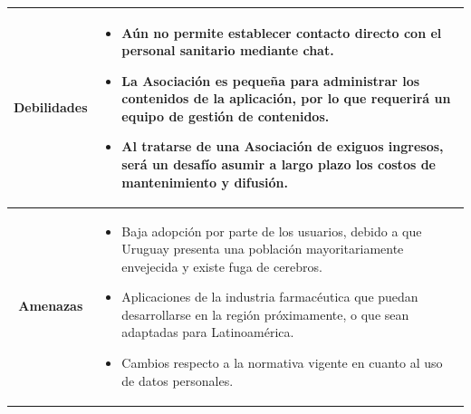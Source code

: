 \begin{tabular}{|c|l|}
\hline
\textbf{Debilidades} & \parbox{10cm}{
\begin{itemize}
    \item Aún no permite establecer contacto directo con el personal sanitario mediante chat.
    \item La Asociación es pequeña para administrar los contenidos de la aplicación, por lo que requerirá un equipo de gestión de contenidos.
    \item Al tratarse de una Asociación de exiguos ingresos, será un desafío asumir a largo plazo los costos de mantenimiento y difusión.
\end{itemize}
} \\
\hline
\textbf{Amenazas} & \parbox{10cm}{
\begin{itemize}
    \item Baja adopción por parte de los usuarios, debido a que Uruguay presenta una población mayoritariamente envejecida y existe fuga de cerebros.
    \item Aplicaciones de la industria farmacéutica que puedan desarrollarse en la región próximamente, o que sean adaptadas para Latinoamérica. 
    \item Cambios respecto a la normativa vigente en cuanto al uso de datos personales.
\end{itemize}
} \\
\hline
\end{tabular}





